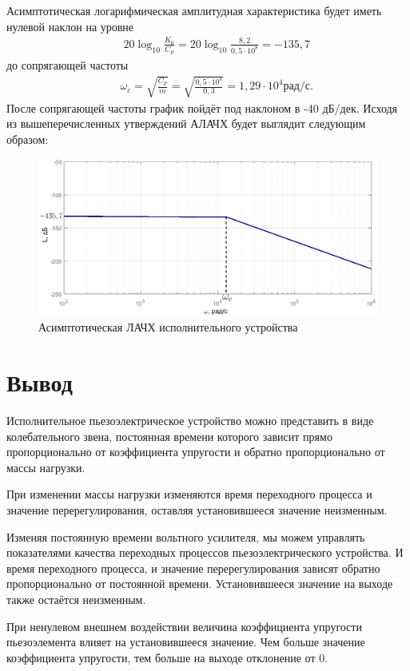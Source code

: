 \documentclass[fleqn, a4paper, 11pt, russian]{article}
\begin{document}
	Асимптотическая логарифмическая амплитудная характеристика будет иметь нулевой наклон на уровне 
	\begin{align}
		&&20\log_{10} \displaystyle{\frac{K_0}{C_p}} = 20\log_{10} \displaystyle{\frac{8,2}{0,5\cdot10^8}} = -135,7
	\end{align}
	до сопрягающей частоты 
	\begin{align}
		&&\omega_c = \sqrt{\displaystyle{\frac{C_p}{m}}} = \sqrt{\displaystyle{\frac{0,5\cdot10^8}{0,3}}} = 1,29\cdot10^4 \text{рад/с}.
	\end{align}
	После сопрягающей частоты график пойдёт под наклоном в -40 дБ/дек. Исходя из вышеперечисленных утверждений АЛАЧХ будет выглядит следующим образом:
	\begin{figure}[ht!]
		\centering
		\includegraphics[width = \textwidth]{base/ALAPR}
		\caption{Асимптотическая ЛАЧХ исполнительного устройства}
	\end{figure}
	\clearpage
	\section*{Вывод}
	Исполнительное пьезоэлектрическое устройство можно представить в виде колебательного звена, постоянная времени которого зависит прямо пропорционально от коэффициента упругости и обратно пропорционально от массы нагрузки.
	
	При изменении массы нагрузки изменяются время переходного процесса и значение перерегулирования, оставляя установившееся значение неизменным.
	
	Изменяя постоянную времени вольтного усилителя, мы можем управлять показателями качества переходных процессов пьезоэлектрического устройства. И время переходного процесса, и значение перерегулирования зависят обратно пропорционально от постоянной времени. Установившееся значение на выходе также остаётся неизменным.
	
	При ненулевом внешнем воздействии величина коэффициента упругости пьезоэлемента влияет на установившееся значение. Чем больше значение коэффициента упругости, тем больше на выходе отклонение от 0.
	
\end{document}
